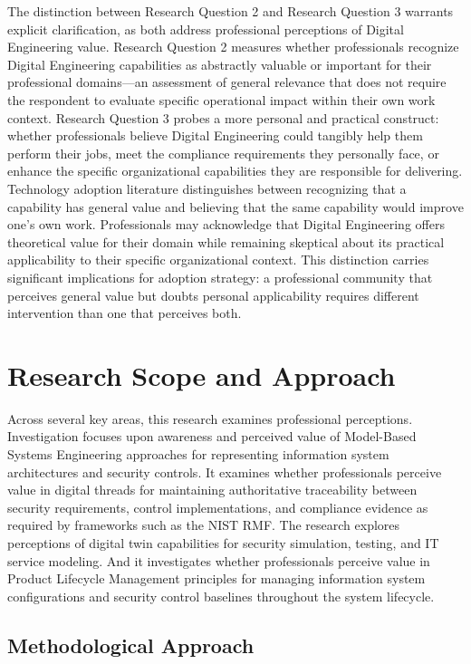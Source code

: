 The distinction between Research Question 2 and Research Question 3 warrants explicit clarification, as both address professional perceptions of Digital Engineering value. Research Question 2 measures whether professionals recognize Digital Engineering capabilities as abstractly valuable or important for their professional domains---an assessment of general relevance that does not require the respondent to evaluate specific operational impact within their own work context. Research Question 3 probes a more personal and practical construct: whether professionals believe Digital Engineering could tangibly help them perform their jobs, meet the compliance requirements they personally face, or enhance the specific organizational capabilities they are responsible for delivering. Technology adoption literature distinguishes between recognizing that a capability has general value and believing that the same capability would improve one's own work. Professionals may acknowledge that Digital Engineering offers theoretical value for their domain while remaining skeptical about its practical applicability to their specific organizational context. This distinction carries significant implications for adoption strategy: a professional community that perceives general value but doubts personal applicability requires different intervention than one that perceives both.

\section{Research Scope and Approach}

Across several key areas, this research examines professional perceptions. Investigation focuses upon awareness and perceived value of Model-Based Systems Engineering approaches for representing information system architectures and security controls. It examines whether professionals perceive value in digital threads for maintaining authoritative traceability between security requirements, control implementations, and compliance evidence as required by frameworks such as the NIST RMF\@. The research explores perceptions of digital twin capabilities for security simulation, testing, and IT service modeling. And it investigates whether professionals perceive value in Product Lifecycle Management principles for managing information system configurations and security control baselines throughout the system lifecycle.

\subsection{Methodological Approach}

